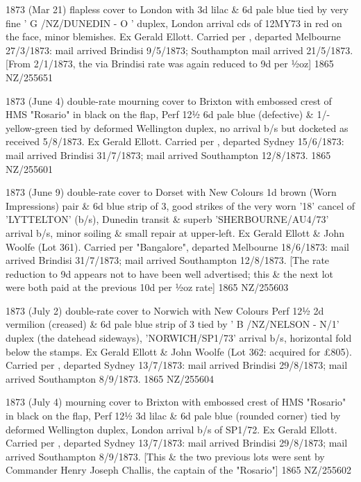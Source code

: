 \documentclass[justified]{tufte-book}
\begin{document}
%
{1873 (Mar 21) flapless cover to London with 3d lilac \& 6d pale blue tied by very fine ' G /NZ/DUNEDIN - O ' duplex, London arrival cds of 12MY73 in red on the face, minor blemishes. Ex Gerald Ellott. Carried per , departed Melbourne 27/3/1873: mail arrived Brindisi 9/5/1873; Southampton mail arrived 21/5/1873. [From 2/1/1873, the via Brindisi rate was again reduced to 9d per ½oz]}%
{1865}%
{NZ/255651}%
{}%
{}
{}%
{}%

%
{1873 (June 4) double-rate mourning cover to Brixton with embossed crest of HMS "Rosario" in black on the flap, Perf 12½ 6d pale blue (defective) \& 1/- yellow-green tied by deformed Wellington duplex, no arrival b/s but docketed as received 5/8/1873. Ex Gerald Ellott. Carried per , departed Sydney 15/6/1873: mail arrived Brindisi 31/7/1873; mail arrived Southampton 12/8/1873.}%
{1865}%
{NZ/255601}%
{}%
{}
{}%
{}%

%
{1873 (June 9) double-rate cover to Dorset with New Colours 1d brown (Worn Impressions) pair \& 6d blue strip of 3, good strikes of the very worn '18' cancel of 'LYTTELTON' (b/s), Dunedin transit \& superb 'SHERBOURNE/AU4/73' arrival b/s, minor soiling \& small repair at upper-left. Ex Gerald Ellott \& John Woolfe (Lot 361). Carried per "Bangalore", departed Melbourne 18/6/1873: mail arrived Brindisi 31/7/1873; mail arrived Southampton 12/8/1873. [The rate reduction to 9d appears not to have been well advertised; this \& the next lot were both paid at the previous 10d per ½oz rate]}%
{1865}%
{NZ/255603}%
{}%
{}
{}%
{}%

%
{1873 (July 2) double-rate cover to Norwich with New Colours Perf 12½ 2d vermilion (creased) \& 6d pale blue strip of 3 tied by ' B /NZ/NELSON - N/1' duplex (the datehead sideways), 'NORWICH/SP1/73' arrival b/s, horizontal fold below the stamps. Ex Gerald Ellott \& John Woolfe (Lot 362: acquired for £805). Carried per , departed Sydney 13/7/1873: mail arrived Brindisi 29/8/1873; mail arrived Southampton 8/9/1873.}%
{1865}%
{NZ/255604}%
{}%
{}
{}%
{}%

%
{1873 (July 4) mourning cover to Brixton with embossed crest of HMS "Rosario" in black on the flap, Perf 12½ 3d lilac \& 6d pale blue (rounded corner) tied by deformed Wellington duplex, London arrival b/s of SP1/72. Ex Gerald Ellott. Carried per , departed Sydney 13/7/1873: mail arrived Brindisi 29/8/1873; mail arrived Southampton 8/9/1873. [This \& the two previous lots were sent by Commander Henry Joseph Challis, the captain of the "Rosario"]}%
{1865}%
{NZ/255602}%
{}%
{}
{}%
{}%
\end{document}
